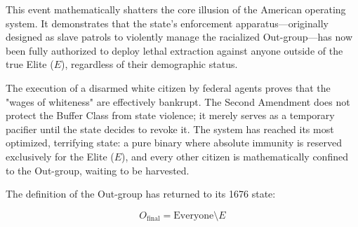 \documentclass[12pt,openany]{book}
\begin{document}
This event mathematically shatters the core illusion of the American operating system. It demonstrates that the state's enforcement apparatus—originally designed as slave patrols to violently manage the racialized Out-group—has now been fully authorized to deploy lethal extraction against anyone outside of the true Elite ($E$), regardless of their demographic status.

The execution of a disarmed white citizen by federal agents proves that the "wages of whiteness" are effectively bankrupt. The Second Amendment does not protect the Buffer Class from state violence; it merely serves as a temporary pacifier until the state decides to revoke it. The system has reached its most optimized, terrifying state: a pure binary where absolute immunity is reserved exclusively for the Elite ($E$), and every other citizen is mathematically confined to the Out-group, waiting to be harvested.

The definition of the Out-group has returned to its 1676 state:

\[
O_{\text{final}} = \text{Everyone} \setminus E
\]
\end{document}
